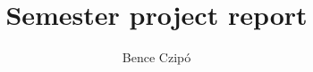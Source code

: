 \documentclass[12pt]{article}
\theoremstyle{definition}
\theoremstyle{plain}
\begin{document}
		
	\title{Semester project report}
	\author{Bence Czipó}
	
	\maketitle
	
	
	
	
	
	
\end{document}
